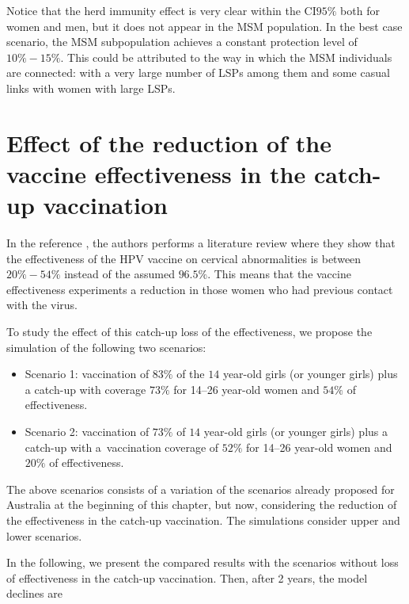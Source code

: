 Notice that the herd immunity effect is very clear within the CI$95\%$ both for women and men, but it does not appear in the MSM population. In the best case scenario, the MSM subpopulation achieves a constant protection level of $10\%-15\%$. This could be attributed to the way in which the MSM individuals are connected: with a very large number of LSPs among them and some casual links with women with large LSPs.

\section{Effect of the reduction of the vaccine effectiveness in the catch-up vaccination}
In the reference \cite{Skufca}, the authors performs a literature review where they show that the effectiveness of the HPV vaccine on cervical abnormalities is between $20\%-54\%$ instead of the assumed $96.5\%$. This means that the vaccine effectiveness experiments a reduction in those women who had previous contact with the virus.

To study the effect of this catch-up loss of the effectiveness, we propose the simulation of the following two scenarios: 

\begin{itemize}
	\item Scenario 1: vaccination of $83\%$ of the $14$ year-old girls (or younger girls) plus a catch-up with coverage $73\%$ for 14--26 year-old women and $54\%$ of effectiveness.
	\item Scenario 2: vaccination of $73\%$ of $14$ year-old girls (or younger girls) plus a catch-up with a~vaccination coverage of $52\%$ for 14--26 year-old women and $20\%$ of effectiveness.
\end{itemize}

The above scenarios consists of a variation of the scenarios already proposed  for Australia at the beginning of this chapter, but now, considering the reduction of the effectiveness in the catch-up vaccination. The simulations consider upper and lower scenarios. 

In the following, we present the compared results with the scenarios without loss of effectiveness in the catch-up vaccination. Then, after 2 years, the model declines are

